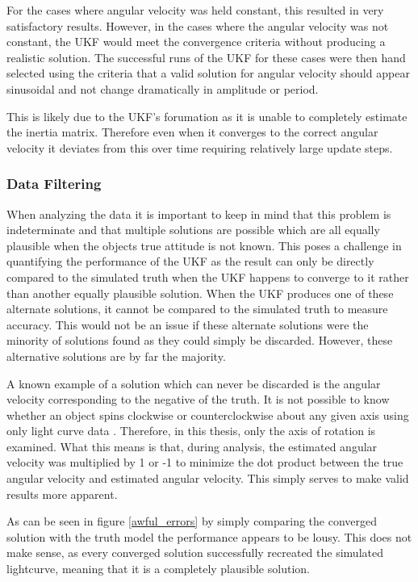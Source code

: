 For the cases where angular velocity was held constant, this resulted in very satisfactory results. However, in the cases where the angular velocity was not constant, the UKF would meet the convergence criteria without producing a realistic solution. The successful runs of the UKF for these cases were then hand selected using the criteria that a valid solution for angular velocity should appear sinusoidal and not change dramatically in amplitude or period.

This is likely due to the UKF's forumation as it is unable to completely estimate the inertia matrix. Therefore even when it converges to the correct angular velocity it deviates from this over time requiring relatively large update steps.

\subsubsection{Data Filtering}

When analyzing the data it is important to keep in mind that this problem is indeterminate and that multiple solutions are possible which are all equally plausible when the objects true attitude is not known. This poses a challenge in quantifying the performance of the UKF as the result can only be directly compared to the simulated truth when the UKF happens to converge to it rather than another equally plausible solution. When the UKF produces one of these alternate solutions, it cannot be compared to the simulated truth to measure accuracy. This would not be an issue if these alternate solutions were the minority of solutions found as they could simply be discarded. However, these alternative solutions are by far the majority.

A known example of a solution which can never be discarded is the angular velocity corresponding to the negative of the truth. It is not possible to know whether an object spins clockwise or counterclockwise about any given axis using only light curve data \cite{Spin_Direction}. Therefore, in this thesis, only the axis of rotation is examined. What this means is that, during analysis, the estimated angular velocity was multiplied by 1 or -1 to minimize the dot product between the true angular velocity and estimated angular velocity. This simply serves to make valid results more apparent.

As can be seen in figure \ref{awful_errors} by simply comparing the converged solution with the truth model the performance appears to be lousy. This does not make sense, as every converged solution successfully recreated the simulated lightcurve, meaning that it is a completely plausible solution.

